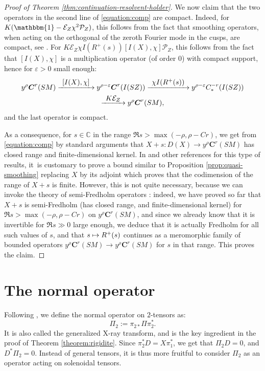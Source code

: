 \documentclass[JEP,XML,SOM,Unicode,NoFloatCountersInSection]{cedram}
\newcommand\mto{\mathchoice{\longmapsto}{\mapsto}{\mapsto}{\mapsto}}
\newcommand\To[1]{\mathchoice{\xrightarrow{\textstyle\kern4pt#1\kern3pt}}{\stackrel{#1}{\longrightarrow}}{}{}}
\newcommand{\bC}{\boldsymbol{C}}
\newcommand{\C}{\mathbb{C}}
\newcommand{\eps}{\varepsilon}
\newcommand{\mc}{\mathcal}
\newcommand{\ZZ}{I(SZ)}
\theoremstyle{plain}
\theoremstyle{definition}
\begin{document}
\begin{proof}[Proof of Theorem \ref{thm:continuation-resolvent-holder}]
We now claim that the two operators in the second line of \eqref{equation:comp} are compact. Indeed, for $K(\mathbbm{1}-\mathcal{E}_Z\chi^2\mathcal{P}_Z)$, this follows from the fact that smoothing operators, when acting on the orthogonal of the zeroth Fourier mode in the cusps, are compact, see \cite[Lem.\,4.1]{Bonthonneau-Lefeuvre-19-1}. For $K \mathcal{E}_Z\chi I(R^+(s)) [I(X), \chi] \mathcal{P}_Z$, this follows from the fact that $[I(X),\chi]$ is a multiplication operator (of order $0$) with compact support, hence for $\eps > 0$ small enough:
\begin{multline*}
y^\rho\bC^r(SM) \To{[I(X),\chi]} y^{\rho-\eps} \bC^r(\ZZ) \To{\chi I(R^+(s))} y^{\rho-\eps} C^{-r}_*(\ZZ)\\
\To{K \mc{E}_Z} y^{\rho}\bC^r(SM),
\end{multline*}
and the last operator is compact.

As a consequence, for $s \in \C$ in the range $\Re s > \max(-\rho,\rho-Cr)$, we get from \eqref{equation:comp} by standard arguments that $X+s : D(X) \to y^\rho \bC^r(SM)$ has closed range and finite-dimensional kernel. In \cite{Dyatlov-Zworski-16} and other references for this type of results, it~is customary to prove a bound similar to Proposition \ref{prop:quasi-smoothing} replacing $X$ by its adjoint which proves that the codimension of the range of $X+s$ is finite. However, this is not quite necessary, because we can invoke the theory of semi-Fredholm operators \cite[Th.\,5.17, p.\,235] {Kato-95}: indeed, we have proved so far that $X+s$ is semi-Fredholm (\ie has closed range, and finite-dimensional kernel) for $\Re s > \max(- \rho,\rho-Cr)$ on $y^\rho \bC^{r}(SM)$, and since we already know that it is invertible for $\Re s \gg 0$ large enough, we deduce that it is actually Fredholm for all such values of $s$, and that $s \mto R^+(s)$ continues as a meromorphic family of bounded operators $ y^\rho \bC^r(SM) \to y^\rho \bC^r(SM)$ for $s$ in that range.
This proves the claim.
\end{proof}

\section{The normal operator}

\label{section:pi2}

Following \cite{Guillarmou-17-1}, we define the normal operator on $2$-tensors as:
\begin{equation}\label{eq:def-Pi2}
\Pi_2 := \pi_{2\ast} \Pi \pi_2^\ast.
\end{equation}
It is also called the generalized X-ray transform, and is the key ingredient in the proof of Theorem \ref{theorem:rigidite}. Since $\pi_2^\ast D = X\pi_1^\ast$, we get that $\Pi_2 D = 0$, and $D^\ast \Pi_2 = 0$. Instead of general tensors, it is thus more fruitful to consider $\Pi_2$ as an operator acting on solenoidal tensors.
\end{document}
